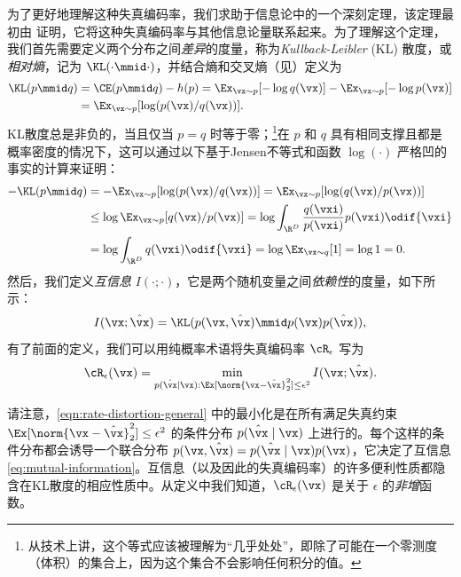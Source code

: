 \documentclass[../../book-main_zh.tex]{subfiles}
\begin{document}
为了更好地理解这种失真编码率，我们求助于信息论中的一个深刻定理，该定理最初由 \textcite{shannon1959coding} 证明，它将这种失真编码率与其他信息论量联系起来。为了理解这个定理，我们首先需要定义两个分布之间\textit{差异}的度量，称为\textit{Kullback-Leibler} (KL) 散度，或\textit{相对熵}，记为 \(\KL(\cdot \mmid \cdot)\)，并结合熵和交叉熵（见）定义为
\begin{align}
    \KL(p \mmid q) &= \CE(p \mmid q) - h(p) = \Ex_{\vx \sim p}[-\log
    q(\vx)] - \Ex_{\vx \sim p}[-\log p(\vx)] \\
    &= \Ex_{\vx \sim p}[\log (p(\vx)/q(\vx))].
\end{align}
KL散度总是非负的，当且仅当 \(p = q\) 时等于零；\footnote{从技术上讲，这个等式应该被理解为“几乎处处”，即除了可能在一个零测度（体积）的集合上，因为这个集合不会影响任何积分的值。}在 \(p\) 和 \(q\) 具有相同支撑且都是概率密度的情况下，这可以通过以下基于Jensen不等式和函数 \(\log(\cdot)\) 严格凹的事实的计算来证明：
\begin{align}
    - \KL(p\mmid q)
    &= -\Ex_{\vx \sim p}[\log(p(\vx)/q(\vx))] = \Ex_{\vx \sim
    p}[\log(q(\vx)/p(\vx))] \\
    &\leq \log \Ex_{\vx \sim p}[q(\vx)/p(\vx)] =  \log \int_{\R^{D}}
    \frac{q(\vxi)}{p(\vxi)}p(\vxi)\odif{\vxi} \\
    &= \log \int_{\R^{D}}q(\vxi)\odif{\vxi} = \log \Ex_{\vx \sim
    q}[1] = \log 1 = 0.
\end{align}
然后，我们定义\textit{互信息} \(I(\cdot; \cdot)\)，它是两个随机变量之间\textit{依赖性}的度量，如下所示：
\begin{equation}\label{eq:mutual-information}
    I(\vx; \hat{\vx})
    = \KL(p(\vx, \hat{\vx}) \mmid p(\vx) p(\hat{\vx})),
\end{equation}
有了前面的定义，我们可以用纯概率术语将失真编码率 \(\cR_{\epsilon}\) 写为
\begin{equation}
    \cR_{\epsilon}(\vx)
    = \min_{p(\hat \vx \mid \vx): \Ex[\norm{\vx -\hat \vx}_2^{2}] \le
    \epsilon^{2}}
    I(\vx; \hat{\vx}).
    \label{eqn:rate-distortion-general}
\end{equation}

请注意，\eqref{eqn:rate-distortion-general} 中的最小化是在所有满足失真约束 $\Ex[\norm{\vx- \hat \vx}_2^{2}] \le \epsilon^{2}$ 的条件分布 $p(\hat \vx \mid \vx)$ 上进行的。每个这样的条件分布都会诱导一个联合分布 $p(\vx, \hat{\vx}) = p(\hat\vx \mid \vx) p(\vx)$，它决定了互信息 \eqref{eq:mutual-information}。互信息（以及因此的失真编码率）的许多便利性质都隐含在KL散度的相应性质中。从定义中我们知道，$\cR_{\epsilon}(\vx)$ 是关于 $\epsilon$ 的{\em 非增}函数。
\end{document}
